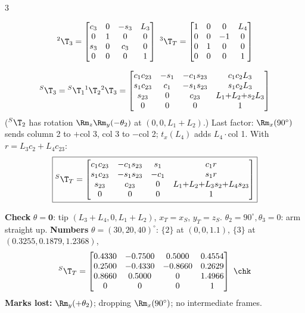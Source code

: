 \begin{multicols}{3}
\begin{examq}
\[{}^2\T_3=\begin{bmatrix}c_3&0&-s_3&L_3\\0&1&0&0\\s_3&0&c_3&0\\0&0&0&1\end{bmatrix}\ {}^3\T_T=\begin{bmatrix}1&0&0&L_4\\0&0&-1&0\\0&1&0&0\\0&0&0&1\end{bmatrix}\]
\end{examq}
\begin{examq}
\[{}^S\T_3={}^S\T_1{}^1\T_2{}^2\T_3=\begin{bmatrix}c_1c_{23}&-s_1&-c_1s_{23}&c_1c_2L_3\\s_1c_{23}&c_1&-s_1s_{23}&s_1c_2L_3\\s_{23}&0&c_{23}&L_1{+}L_2{+}s_2L_3\\0&0&0&1\end{bmatrix}\]
(${}^S\T_2$ has rotation $\Rm_z\Rm_y(-\theta_2)$ at $(0,0,L_1{+}L_2)$.) Last factor: $\Rm_x(90^\circ)$ sends column 2 to $+$col 3, col 3 to $-$col 2; $t_x(L_4)$ adds $L_4\cdot$col 1. With $r=L_3c_2+L_4c_{23}$:
\[\boxed{{}^S\T_T=\begin{bmatrix}c_1c_{23}&-c_1s_{23}&s_1&c_1r\\s_1c_{23}&-s_1s_{23}&-c_1&s_1r\\s_{23}&c_{23}&0&L_1{+}L_2{+}L_3s_2{+}L_4s_{23}\\0&0&0&1\end{bmatrix}}\]
\end{examq}
\begin{examq}
\textbf{Check} $\theta=\mathbf0$: tip $(L_3{+}L_4,0,L_1{+}L_2)$, $x_T=x_S$, $y_T=z_S$. $\theta_2=90^\circ,\theta_3=0$: arm straight up. \textbf{Numbers} $\theta=(30,20,40)^\circ$: $\{2\}$ at $(0,0,1.1)$, $\{3\}$ at $(0.3255,0.1879,1.2368)$,
\[{}^S\T_T=\begin{bmatrix}0.4330&-0.7500&0.5000&0.4554\\0.2500&-0.4330&-0.8660&0.2629\\0.8660&0.5000&0&1.4966\\0&0&0&1\end{bmatrix}\ \chk\]
\textbf{Marks lost:} $\Rm_y(+\theta_2)$; dropping $\Rm_x(90^\circ)$; no intermediate frames.
\end{examq}
\begin{examq}

\end{examq}
\end{multicols}
